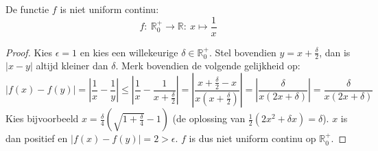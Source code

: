 \documentclass[main.tex]{subfiles}
\begin{document}
\begin{tvb}
  De functie $f$ is niet uniform continu:
  \[ f:\ \mathbb{R}_{0}^{+} \rightarrow \mathbb{R}:\ x \mapsto \frac{1}{x} \]

  \begin{proof}
    Kies $\epsilon = 1$ en kies een willekeurige $\delta \in \mathbb{R}_{0}^{+}$.
    Stel bovendien $y = x + \frac{\delta}{2}$, dan is $|x-y|$ altijd kleiner dan $\delta$.
    Merk bovendien de volgende gelijkheid op:
    \[ |f(x)-f(y)| = \left| \frac{1}{x} - \frac{1}{y} \right| \le \left| \frac{1}{x} - \frac{1}{x + \frac{\delta}{2}} \right| = \left| \frac{x+\frac{\delta}{2}-x}{x(x+\frac{\delta}{2})}\right| = \left| \frac{\delta}{x(2x+\delta)} \right| = \frac{\delta}{x(2x+\delta)} \]
    Kies bijvoorbeeld $x = \frac{\delta}{4}\left(\sqrt{1+\frac{\delta}{4}}-1\right)$ (de oplossing van $\frac{1}{2}(2x^{2}+\delta x) = \delta$).
    $x$ is dan positief en $|f(x)-f(y)| = 2 > \epsilon$.
    $f$ is dus niet uniform continu op $\mathbb{R}_{0}^{+}$.
  \end{proof}
\end{tvb}

\end{document}
